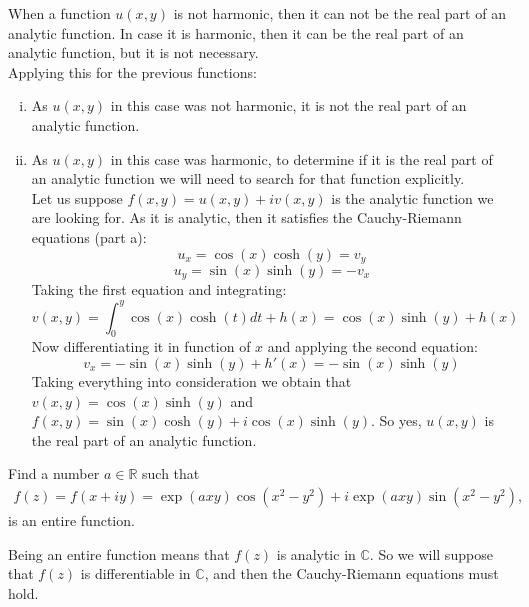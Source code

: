 \documentclass{report}
\def\C{\mathbb{C}}
\def\R{\mathbb{R}}
\renewcommand{\exp}[1]{\operatorname{exp}\left(#1\right)}
\begin{document}
    When a function $u(x,y)$ is not harmonic, then it can not be the real part of an analytic function. In case it is harmonic, then it can be the real part of an analytic function, but it is not necessary.\\
    Applying this for the previous functions:
    \begin{enumerate}[(i)]
        \item As $u(x,y)$ in this case was not harmonic, it is not the real part of an analytic function.
        \item As $u(x,y)$ in this case was harmonic, to determine if it is the real part of an analytic function we will need to search for that function explicitly. 
        \\Let us suppose $f(x,y)=u(x,y)+iv(x,y)$ is the analytic function we are looking for. As it is analytic, then it satisfies the Cauchy-Riemann equations (part a):\\
        \begin{equation*}
            u_x=\cos(x)\cosh(y)=v_y
        \end{equation*}
        \begin{equation*}
            u_y=\sin(x)\sinh(y)=-v_x
        \end{equation*}
        Taking the first equation and integrating:\\
        \begin{equation*}
            v(x,y)=\int_{0}^y\cos(x)\cosh(t)dt+h(x)=\cos(x)\sinh(y)+h(x)
        \end{equation*}
        Now differentiating it in function of $x$ and applying the second equation:\\
        \begin{equation*}
            v_x=-\sin(x)\sinh(y) + h'(x) = -\sin(x)\sinh(y)
        \end{equation*}
        Taking everything into consideration we obtain that $v(x,y)=\cos(x)\sinh(y)$ and $f(x,y)= \sin(x)\cosh(y)+i\cos(x)\sinh(y)$. So yes, $u(x,y)$ is the real part of an analytic function.
    \end{enumerate}
    \begin{tcolorbox}[title=Part c]
        Find a number $a\in\R$ such that
        \begin{align*}
            f(z)=f(x+iy)=\exp{axy}\cos(x^2-y^2)+i\exp{axy}\sin(x^2-y^2),
        \end{align*}
        is an entire function.
    \end{tcolorbox}
    Being an entire function means that $f(z)$ is analytic in $\C$. So we will suppose that $f(z)$ is differentiable in $\C$, and then the Cauchy-Riemann equations must hold.\\
\end{document}
